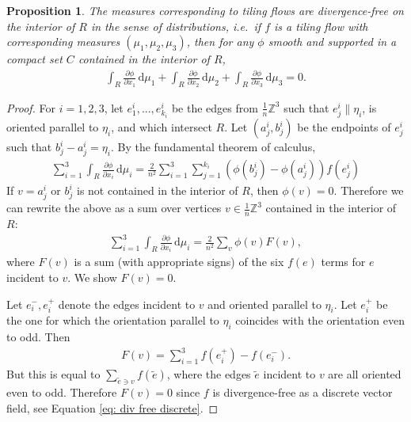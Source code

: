 \documentclass[11pt]{article}
\newtheorem{prop}[thm]{Proposition}
\theoremstyle{remark}
\theoremstyle{definition}
\newcommand{\m}[1]{\mathbb{#1}}
\newcommand{\dd}{\mathrm{d}}
\begin{document}
\begin{prop}\label{prop:div_free}
    The measures corresponding to tiling flows are divergence-free on the interior of $R$ in the sense of distributions, i.e.\ if $f$ is a tiling flow with corresponding measures $(\mu_1,\mu_2,\mu_3)$, then for any $\phi$ smooth and supported in a compact set $C$ contained in the interior of $R$,
    \begin{align*}
        \int_{R} \frac{\partial \phi}{\partial x_1} \, \dd \mu_1 + \int_{R} \frac{\partial \phi}{\partial x_2} \, \dd \mu_2 + \int_{R} \frac{\partial \phi}{\partial x_3} \, \dd \mu_3 = 0.
    \end{align*}
\end{prop}
\begin{proof}
For $i=1,2,3$, let $e_1^i,...,e_{k_i}^i$ be the edges from $\frac{1}{n} \m Z^3$ such that $e_j^i\parallel \eta_i$, is oriented parallel to $\eta_i$, and which intersect $R$. Let $(a_j^i,b_j^i)$ be the endpoints of $e_j^i$ such that $b_j^i-a_j^i=\eta_i$. By the fundamental theorem of calculus, 
\begin{align*}
    \sum_{i=1}^3 \int_{R} \frac{\partial \phi}{\partial x_i} \, \dd \mu_i = \frac{2}{n^2} \sum_{i=1}^3 \sum_{j=1}^{k_i} (\phi(b_j^i)-\phi(a_j^i)) f(e_j^i) 
\end{align*}
If $v= a_j^i$ or $b_j^i$ is not contained in the interior of $R$, then $\phi(v) = 0$. Therefore we can rewrite the above as a sum over vertices $v\in \frac{1}{n}\m Z^3$ contained in the interior of $R$:
\begin{align*}
    \sum_{i=1}^3 \int_{R} \frac{\partial \phi}{\partial x_i} \, \dd \mu_i = \frac{2}{n^2} \sum_{v} \phi(v) F(v),
\end{align*}
where $F(v)$ is a sum (with appropriate signs) of the six $f(e)$ terms for $e$ incident to $v$. We show $F(v) = 0$. 

Let $e_i^-,e_i^+$ denote the edges incident to $v$ and oriented parallel to $\eta_i$. Let $e_i^+$ be the one for which the orientation parallel to $\eta_i$ coincides with the orientation even to odd. Then 
\begin{align*}
    F(v) = \sum_{i=1}^3 f(e_i^+) - f(e_i^-).
\end{align*}
But this is equal to $\sum_{\tilde{e}\ni v} f(\tilde{e})$, where the edges $\tilde{e}$ incident to $v$ are all oriented even to odd. Therefore $F(v) = 0$ since $f$ is divergence-free as a discrete vector field, see Equation \eqref{eq: div free discrete}. 
\end{proof}
\end{document}
